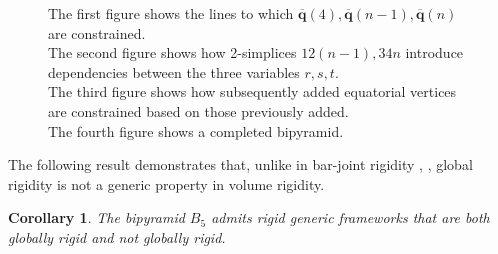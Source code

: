 \documentclass[11pt]{amsart}
\newtheorem{corollary}[theorem]{Corollary}
\theoremstyle{definition}
\theoremstyle{remark}
\begin{document}
\begin{figure}
        \caption{The first figure shows the lines to which $\overline{\mathbf{q}}(4),\overline{\mathbf{q}}(n-1),\overline{\mathbf{q}}(n)$ are constrained.\\
        The second figure shows how 2-simplices $12(n-1),34n$ introduce dependencies between the three variables $r,s,t$.\\
        The third figure shows how subsequently added equatorial vertices are constrained based on those previously added.\\
        The fourth figure shows a completed bipyramid.}
        \label{fig:bipcount}
\end{figure}

The following result demonstrates that, unlike in bar-joint rigidity \cite{connelly2005generic}, \cite{gortler2010characterizing}, global rigidity is not a generic property in volume rigidity.

\begin{corollary}\label{cor:notggr}
    The bipyramid $B_5$ admits rigid generic frameworks that are both globally rigid and not globally rigid.
\end{corollary}
\end{document}
